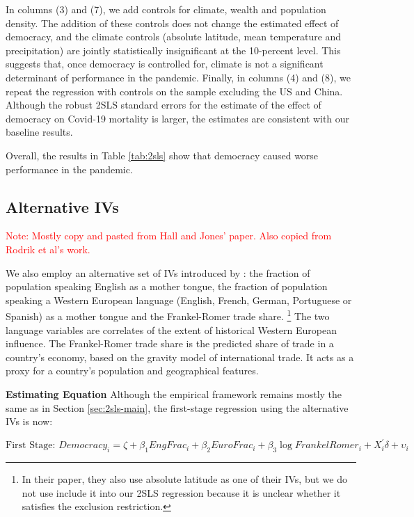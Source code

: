 In columns (3) and (7), we add controls for climate, wealth and population density. The addition of these controls does not change the estimated effect of democracy, and the climate controls (absolute latitude, mean temperature and precipitation) are jointly statistically insignificant at the 10-percent level. This suggests that, once democracy is controlled for, climate is not a significant determinant of performance in the pandemic. Finally, in columns (4) and (8), we repeat the regression with controls on the sample excluding the US and China. Although the robust 2SLS standard errors for the estimate of the effect of democracy on Covid-19 mortality is larger, the estimates are consistent with our baseline results.  

Overall, the results in Table \ref{tab:2sls} show that democracy caused worse performance in the pandemic.

\subsection{Alternative IVs} \label{2sls-alternative}

\textcolor{red}{Note: Mostly copy and pasted from Hall and Jones' paper. Also copied from Rodrik et al's work. }

We also employ an alternative set of IVs introduced by \citet{hj}: the fraction of population speaking English as a mother tongue, the fraction of population speaking a Western European language (English, French, German, Portuguese or Spanish) as a mother tongue and the Frankel-Romer trade share. \footnote{In their paper, they also use absolute latitude as one of their IVs, but we do not use include it into our 2SLS regression because it is unclear whether it satisfies the exclusion restriction.} The two language variables are correlates of the extent of historical Western European influence. The Frankel-Romer trade share is the predicted share of trade in a country's economy, based on the gravity model of international trade. It acts as a proxy for a country's population and geographical features. 

\noindent \textbf{Estimating Equation} Although the empirical framework remains mostly the same as in Section \ref{sec:2sls-main}, the first-stage regression using the alternative IVs is now:

\begin{equation}
    \text{First Stage: }Democracy_i = \zeta + \beta_1 EngFrac_i + \beta_2 EuroFrac_i + \beta_3 \log{FrankelRomer}_i + X^{'}_i \delta + \upsilon_i
\end{equation}

